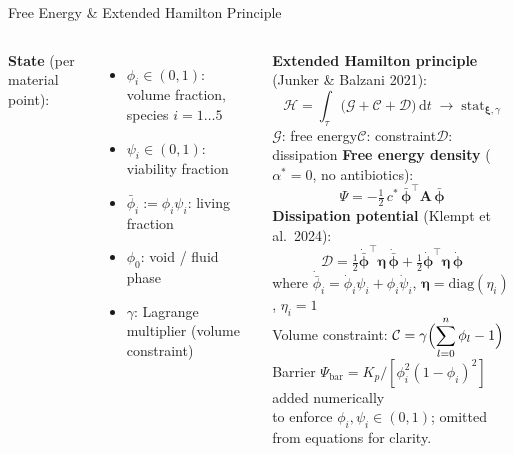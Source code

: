 \documentclass[aspectratio=169,10pt]{beamer}
\newcommand{\bphi}{\boldsymbol{\phi}}
\begin{document}
\begin{frame}[t]{Free Energy \& Extended Hamilton Principle}
  \small
  \begin{columns}[T]
      \textbf{State} (per material point):
      \begin{itemize}
        \item $\phi_i \in (0,1)$: volume fraction, species $i=1\ldots5$
        \item $\psi_i \in (0,1)$: viability fraction
        \item $\bar{\phi}_i := \phi_i\psi_i$: living fraction
        \item $\phi_0$: void / fluid phase
        \item $\gamma$: Lagrange multiplier (volume constraint)
      \end{itemize}
      \vspace{4pt}
      \textbf{Extended Hamilton principle} (Junker \& Balzani 2021):
      \[
        \mathcal{H} = \int_\tau\!\bigl(\mathcal{G} + \mathcal{C} + \mathcal{D}\bigr)\,\mathrm{d}t
        \;\to\; \mathrm{stat}_{\boldsymbol{\xi},\gamma}
      \]
      \vspace{2pt}
      $\mathcal{G}$: free energy\quad $\mathcal{C}$: constraint\quad $\mathcal{D}$: dissipation
      \textbf{Free energy density} ($\alpha^*\!=0$, no antibiotics):
      \[
        \Psi = -\tfrac{1}{2}\,c^*\,\bar{\bphi}^{\top}\!\mathbf{A}\,\bar{\bphi}
      \]
      \vspace{2pt}
      \textbf{Dissipation potential} (Klempt et al.\ 2024):
      \[
        \mathcal{D}
        = \tfrac{1}{2}\dot{\bar{\bphi}}^{\top}\!\boldsymbol{\eta}\,\dot{\bar{\bphi}}
        + \tfrac{1}{2}\dot{\bphi}^{\top}\!\boldsymbol{\eta}\,\dot{\bphi}
      \]
      where $\dot{\bar\phi}_i = \dot\phi_i\psi_i + \phi_i\dot\psi_i$,\;
      $\boldsymbol{\eta}=\mathrm{diag}(\eta_i)$, $\eta_i=1$\\[4pt]
      Volume constraint:
      $\displaystyle\mathcal{C}=\gamma\Bigl(\sum_{l=0}^{n}\phi_l - 1\Bigr)$\\[4pt]
      {\scriptsize Barrier $\Psi_{\mathrm{bar}} = K_p/[\phi_i^2(1-\phi_i)^2]$ added numerically\\to enforce $\phi_i,\psi_i\in(0,1)$; omitted from equations for clarity.}
  \end{columns}
\end{frame}
\end{document}
